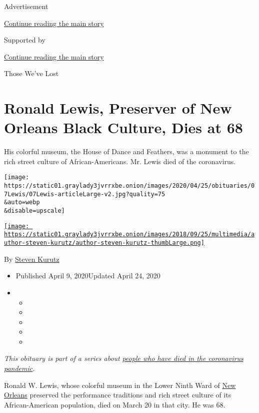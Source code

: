 Advertisement

\protect\hyperlink{after-top}{Continue reading the main story}

Supported by

\protect\hyperlink{after-sponsor}{Continue reading the main story}

Those We've Lost

\hypertarget{ronald-lewis-preserver-of-new-orleans-black-culture-dies-at-68}{%
\section{Ronald Lewis, Preserver of New Orleans Black Culture, Dies at
68}\label{ronald-lewis-preserver-of-new-orleans-black-culture-dies-at-68}}

His colorful museum, the House of Dance and Feathers, was a monument to
the rich street culture of African-Americans. Mr. Lewis died of the
coronavirus.

\texttt{[image: https://static01.graylady3jvrrxbe.onion/images/2020/04/25/obituaries/07Lewis/07Lewis-articleLarge-v2.jpg?quality=75\\\&auto=webp\\\&disable=upscale]}

\href{https://www.nytimes3xbfgragh.onion/by/steven-kurutz}{\texttt{[image: https://static01.graylady3jvrrxbe.onion/images/2018/09/25/multimedia/author-steven-kurutz/author-steven-kurutz-thumbLarge.png]}}

By \href{https://www.nytimes3xbfgragh.onion/by/steven-kurutz}{Steven
Kurutz}

\begin{itemize}
\item
  Published April 9, 2020Updated April 24, 2020
\item
  \begin{itemize}
  \item
  \item
  \item
  \item
  \item
  \end{itemize}
\end{itemize}

\emph{This obituary is part of a series about}
\href{https://www.nytimes3xbfgragh.onion/series/people-who-have-died-of-the-coronavirus}{\emph{people
who have died in the coronavirus pandemic}}\emph{.}

Ronald W. Lewis, whose colorful museum in the Lower Ninth Ward of
\href{https://www.nytimes3xbfgragh.onion/2020/04/13/us/coronavirus-new-orleans-mardi-gras.html}{New
Orleans} preserved the performance traditions and rich street culture of
its African-American population, died on March 20 in that city. He was
68.

